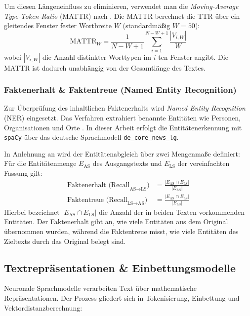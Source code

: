 Um diesen Längeneinfluss zu eliminieren, verwendet man die \textit{Moving-Average Type-Token-Ratio} (MATTR) nach \citet{covington2010cutting}. Die MATTR berechnet die TTR über ein gleitendes Fenster fester Wortbreite $W$ (standardmäßig $W = 50$):
\begin{equation}
    \text{MATTR}_W = \frac{1}{N - W + 1} \sum_{i=1}^{N - W + 1} \frac{|V_{i, W}|}{W}
\end{equation}
wobei $|V_{i, W}|$ die Anzahl distinkter Worttypen im $i$-ten Fenster angibt. Die MATTR ist dadurch unabhängig von der Gesamtlänge des Textes.

\subsubsection{Faktenerhalt \& Faktentreue (Named Entity Recognition)}
Zur Überprüfung des inhaltlichen Faktenerhalts wird \textit{Named Entity Recognition} (NER) eingesetzt. Das Verfahren extrahiert benannte Entitäten wie Personen, Organisationen und Orte \citep{nadeau2007survey}. In dieser Arbeit erfolgt die Entitätenerkennung mit \texttt{spaCy} \citep{honnibal2020spacy} über das deutsche Sprachmodell \texttt{de\_core\_news\_lg}.

In Anlehnung an \citet{devaraj2021evaluating} wird der Entitätenabgleich über zwei Mengenmaße definiert: Für die Entitätenmenge $E_{\text{AS}}$ des Ausgangstexts und $E_{\text{LS}}$ der vereinfachten Fassung gilt:
\begin{align}
    \text{Faktenerhalt (Recall}_{\text{AS} \to \text{LS}}\text{)} &= \frac{|E_{\text{AS}} \cap E_{\text{LS}}|}{|E_{\text{AS}}|} \\
    \text{Faktentreue (Recall}_{\text{LS} \to \text{AS}}\text{)} &= \frac{|E_{\text{AS}} \cap E_{\text{LS}}|}{|E_{\text{LS}}|}
\end{align}
Hierbei bezeichnet $|E_{\text{AS}} \cap E_{\text{LS}}|$ die Anzahl der in beiden Texten vorkommenden Entitäten. Der Faktenerhalt gibt an, wie viele Entitäten aus dem Original übernommen wurden, während die Faktentreue misst, wie viele Entitäten des Zieltexts durch das Original belegt sind.

\subsection{Textrepräsentationen \& Einbettungsmodelle}
\label{sec:textrepraesentationen_einbettungen}

Neuronale Sprachmodelle verarbeiten Text über mathematische Repräsentationen. Der Prozess gliedert sich in Tokenisierung, Einbettung und Vektordistanzberechnung:

